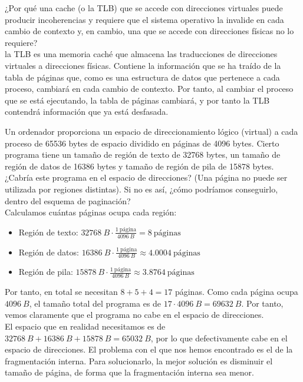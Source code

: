 \begin{ejercicio}
¿Por qué una cache (o la TLB) que se accede con direcciones virtuales puede producir
incoherencias y requiere que el sistema operativo la invalide en cada cambio de
contexto y, en cambio, una que se accede con direcciones físicas no lo requiere?\\

    la TLB es una memoria caché que almacena las traducciones de direcciones virtuales a direcciones físicas.
    Contiene la información que se ha traído de la tabla de páginas que, como es una estructura de datos que pertenece a cada proceso, cambiará en cada cambio de contexto.
    Por tanto, al cambiar el proceso que se está ejecutando, la tabla de páginas cambiará, y por tanto la TLB contendrá información que ya está desfasada.
\end{ejercicio}

\begin{ejercicio}
Un ordenador proporciona un espacio de direccionamiento lógico (virtual) a cada
proceso de 65536 bytes de espacio dividido en páginas de 4096 bytes.
Cierto programa tiene un tamaño de región de texto de 32768 bytes, un
tamaño de región de datos de 16386 bytes y tamaño de región de pila de 15878 bytes.
¿Cabría este programa en el espacio de direcciones? (Una página no puede ser utilizada
por regiones distintas). Si no es así, ¿cómo podríamos conseguirlo, dentro del
esquema de paginación?\\

    Calculamos cuántas páginas ocupa cada región:
    \begin{itemize}
        \item Región de texto: $32768~B \cdot \frac{1~\text{página}}{4096~B} = 8~\text{páginas}$
        \item Región de datos: $16386~B \cdot \frac{1~\text{página}}{4096~B} \approx 4.0004~\text{páginas}$
        \item Región de pila: $15878~B \cdot \frac{1~\text{página}}{4096~B} \approx 3.8764~\text{páginas}$
    \end{itemize}

    Por tanto, en total se necesitan $8+5+4=17$ páginas. Como cada página ocupa $4096~B$, el tamaño total del programa es de
    $17\cdot 4096~B = 69632~B$. Por tanto, vemos claramente que el programa no cabe en el espacio de direcciones.\\

    El espacio que en realidad necesitamos es de $32768~B + 16386~B + 15878~B = 65032~B$, por lo que
    defectivamente cabe en el espacio de direcciones. El problema con el que nos hemos encontrado 
    es el de la fragmentación interna. Para solucionarlo, la mejor solución
    es disminuir el tamaño de página, de forma que la fragmentación interna sea menor.
\end{ejercicio}

